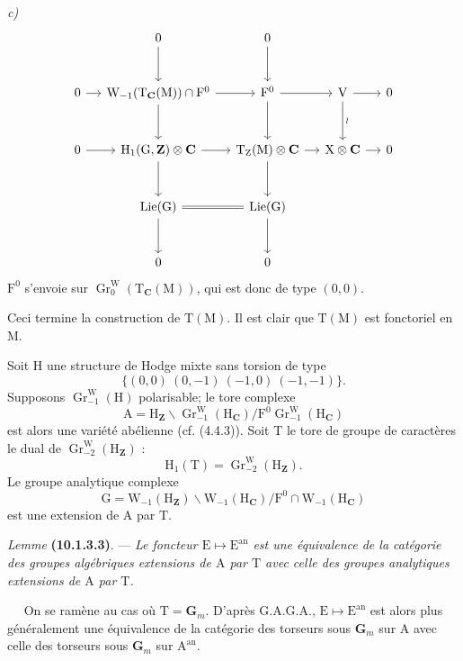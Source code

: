 \documentclass[11pt,leqno]{article}
\newcommand{\Page}[1]{\ifvmode\noindent\else\unskip\ \fi{\footnotesize\textcolor{gray}{[p.\,#1]}}\ \ignorespaces}
\begin{document}
\textit{c)}
\[
\begin{tikzcd}[column sep=1.2em, row sep=2.8em]
& 0 \arrow[d] & 0 \arrow[d] & &
\\
0 \arrow[r]
&
\mathrm{W}_{-1}(\mathrm{T}_{\mathbf{C}}(\mathrm{M}))\cap\mathrm{F}^0
  \arrow[r] \arrow[d]
&
\mathrm{F}^0 \arrow[r] \arrow[d]
&
\mathrm{V} \arrow[r] \arrow[d, "\wr"]
&
0
\\
0 \arrow[r]
&
\mathrm{H}_1(\mathrm{G},\mathbf{Z})\otimes\mathbf{C}
  \arrow[r] \arrow[d]
&
\mathrm{T}_{\mathrm{Z}}(\mathrm{M})\otimes\mathbf{C}
  \arrow[r] \arrow[d]
&
\mathrm{X}\otimes\mathbf{C} \arrow[r]
&
0
\\
&
\operatorname{Lie}(\mathrm{G}) \arrow[r, equal] \arrow[d]
&
\operatorname{Lie}(\mathrm{G}) \arrow[d]
& &
\\
& 0 & 0 & &
\end{tikzcd}
\]
\(\mathrm{F}^0\) s’envoie sur
\(\operatorname{Gr}^{\mathrm{W}}_0(\mathrm{T}_{\mathbf{C}}(\mathrm{M}))\),
qui est donc de type \((0,0)\).\par
Ceci termine la construction de \(\mathrm{T}(\mathrm{M})\).
Il est clair que \(\mathrm{T}(\mathrm{M})\) est fonctoriel en
\(\mathrm{M}\).

Soit \(\mathrm{H}\) une structure de Hodge mixte sans torsion de type
\[
\{(0,0)\ (0,-1)\ (-1,0)\ (-1,-1)\}.
\]
Supposons \(\operatorname{Gr}^{\mathrm{W}}_{-1}(\mathrm{H})\)
polarisable; le tore complexe
\[
\mathrm{A}
=\mathrm{H}_{\mathbf{Z}}\backslash
\operatorname{Gr}^{\mathrm{W}}_{-1}(\mathrm{H}_{\mathbf{C}})
/
\mathrm{F}^0\operatorname{Gr}^{\mathrm{W}}_{-1}
(\mathrm{H}_{\mathbf{C}})
\]
est alors une variété abélienne (cf. (4.4.3)). Soit \(\mathrm{T}\) le
tore de groupe de caractères le dual de
\(\operatorname{Gr}^{\mathrm{W}}_{-2}(\mathrm{H}_{\mathbf{Z}})\) :
\[
\mathrm{H}_1(\mathrm{T})
=\operatorname{Gr}^{\mathrm{W}}_{-2}(\mathrm{H}_{\mathbf{Z}}).
\]
Le groupe analytique complexe
\[
\mathrm{G}
=\mathrm{W}_{-1}(\mathrm{H}_{\mathbf{Z}})\backslash
\mathrm{W}_{-1}(\mathrm{H}_{\mathbf{C}})
/
\mathrm{F}^0\cap\mathrm{W}_{-1}(\mathrm{H}_{\mathbf{C}})
\]
est une extension de \(\mathrm{A}\) par \(\mathrm{T}\).

\textit{Lemme} \textbf{(10.1.3.3)}. —
\textit{Le foncteur \(\mathrm{E}\mapsto\mathrm{E}^{\mathrm{an}}\)
est une équivalence de la catégorie des groupes algébriques extensions
de \(\mathrm{A}\) par \(\mathrm{T}\) avec celle des groupes analytiques
extensions de \(\mathrm{A}\) par \(\mathrm{T}\).}

\Page{56}
On se ramène au cas où \(\mathrm{T}=\mathbf{G}_m\).
D’après G.A.G.A., \(\mathrm{E}\mapsto\mathrm{E}^{\mathrm{an}}\) est
alors plus généralement une équivalence de la catégorie des torseurs
sous \(\mathbf{G}_m\) sur \(\mathrm{A}\) avec celle des torseurs sous
\(\mathbf{G}_m\) sur \(\mathrm{A}^{\mathrm{an}}\).
\end{document}
